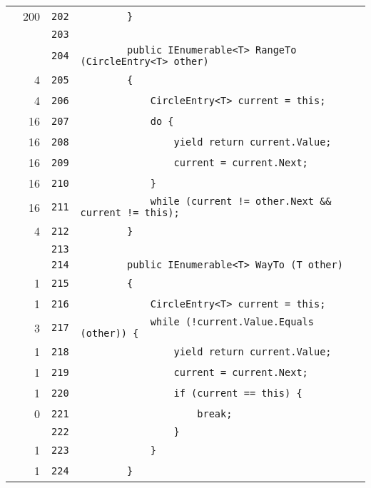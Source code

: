 \documentclass[a4paper,10pt]{article}
\begin{document}
\begin{longtable}[l]{lrrl}
\cellcolor{green} & 200 & \verb~202~ & \verb~        }~\\
\cellcolor{gray} &  & \verb~203~ & \verb~~\\
\cellcolor{gray} &  & \verb~204~ & \verb~        public IEnumerable<T> RangeTo (CircleEntry<T> other)~\\
\cellcolor{green} & 4 & \verb~205~ & \verb~        {~\\
\cellcolor{green} & 4 & \verb~206~ & \verb~            CircleEntry<T> current = this;~\\
\cellcolor{green} & 16 & \verb~207~ & \verb~            do {~\\
\cellcolor{green} & 16 & \verb~208~ & \verb~                yield return current.Value;~\\
\cellcolor{green} & 16 & \verb~209~ & \verb~                current = current.Next;~\\
\cellcolor{green} & 16 & \verb~210~ & \verb~            }~\\
\cellcolor{green} & 16 & \verb~211~ & \verb~            while (current != other.Next && current != this);~\\
\cellcolor{green} & 4 & \verb~212~ & \verb~        }~\\
\cellcolor{gray} &  & \verb~213~ & \verb~~\\
\cellcolor{gray} &  & \verb~214~ & \verb~        public IEnumerable<T> WayTo (T other)~\\
\cellcolor{green} & 1 & \verb~215~ & \verb~        {~\\
\cellcolor{green} & 1 & \verb~216~ & \verb~            CircleEntry<T> current = this;~\\
\cellcolor{green} & 3 & \verb~217~ & \verb~            while (!current.Value.Equals (other)) {~\\
\cellcolor{green} & 1 & \verb~218~ & \verb~                yield return current.Value;~\\
\cellcolor{green} & 1 & \verb~219~ & \verb~                current = current.Next;~\\
\cellcolor{green} & 1 & \verb~220~ & \verb~                if (current == this) {~\\
\cellcolor{red} & 0 & \verb~221~ & \verb~                    break;~\\
\cellcolor{gray} &  & \verb~222~ & \verb~                }~\\
\cellcolor{green} & 1 & \verb~223~ & \verb~            }~\\
\cellcolor{green} & 1 & \verb~224~ & \verb~        }~\\

\end{longtable}
\end{document}
